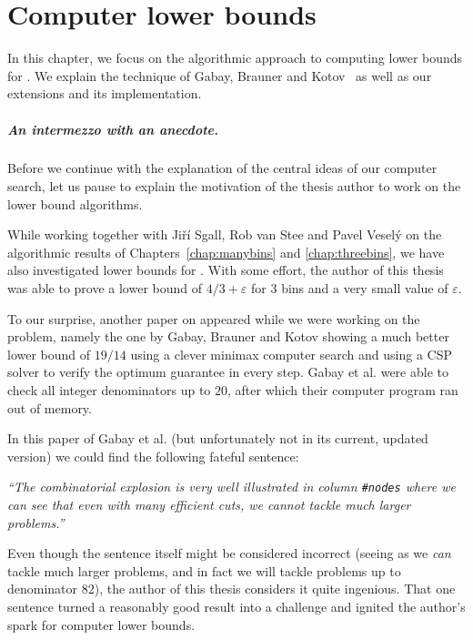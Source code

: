 \chapter{Computer lower bounds}\label{chap:lb}


In this chapter, we focus on the algorithmic approach to computing
lower bounds for \binstretch. We explain the technique of Gabay,
Brauner and Kotov~\cite{gabay2013lbv2} as well as our extensions and
its implementation.

\paragraph{An intermezzo with an anecdote.} Before we continue with
the explanation of the central ideas of our computer search, let us
pause to explain the motivation of the thesis author to work on the
lower bound algorithms.

While working together with Jiří Sgall, Rob van Stee and Pavel Veselý
on the algorithmic results of Chapters~\ref{chap:manybins} and
\ref{chap:threebins}, we have also investigated lower bounds for
\binstretch. With some effort, the author of this thesis was able to
prove a lower bound of $4/3 + \varepsilon$ for $3$ bins and a very
small value of $\varepsilon$.

To our surprise, another paper on \binstretch appeared while we were
working on the problem, namely the one by Gabay, Brauner and Kotov
\cite{gabay2013lbv2} showing a much better lower bound of $19/14$
using a clever minimax computer search and using a CSP solver to
verify the optimum guarantee in every step. Gabay et al. were able to
check all integer denominators up to $20$, after which their computer
program ran out of memory.

In this paper of Gabay et al. (but unfortunately not in its current,
updated version) we could find the following fateful sentence:

\textit{``The combinatorial explosion is very well illustrated in column
\texttt{\#nodes} where we can see that even with many efficient cuts,
we cannot tackle much larger problems.''}\cite{gabay2013lbv2}

Even though the sentence itself might be considered incorrect (seeing
as we \emph{can} tackle much larger problems, and in fact we will
tackle problems up to denominator $82$), the author of this thesis
considers it quite ingenious. That one sentence turned a reasonably
good result into a challenge and ignited the author's spark for
computer lower bounds.

